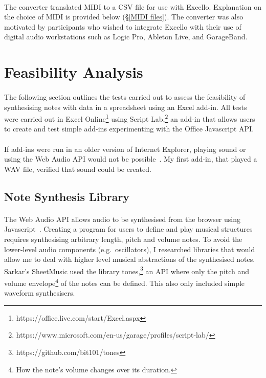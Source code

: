 \paragraph{} The converter translated MIDI to a CSV file for use with Excello. Explanation on the choice of MIDI is provided below (\S\ref{MIDI files}). The converter was also motivated by participants who wished to integrate Excello with their use of digital audio workstations such as Logic Pro, Ableton Live, and GarageBand.

\section{Feasibility Analysis}

\paragraph{} The following section outlines the tests carried out to assess the feasibility of synthesising notes with data in a spreadsheet using an Excel add-in. All tests were carried out in Excel Online\footnote{https://office.live.com/start/Excel.aspx} using Script Lab,\footnote{https://www.microsoft.com/en-us/garage/profiles/script-lab/} an add-in that allows users to create and test simple add-ins experimenting with the Office Javascript API.

\paragraph{} If add-ins were run in an older version of Internet Explorer, playing sound or using the Web Audio API would not be possible~\cite{mozilla:webaudioapi}. My first add-in, that played a WAV file, verified that sound could be created.

\subsection{Note Synthesis Library}

\paragraph{} The Web Audio API allows audio to be synthesised from the browser using Javascript~\cite{mozilla:webaudioapi}. Creating a program for users to define and play musical structures requires synthesising arbitrary length, pitch and volume notes. To avoid the lower-level audio components (e.g.~oscillators), I researched libraries that would allow me to deal with higher level musical abstractions of the synthesised notes. Sarkar's SheetMusic used the library tones,\footnote{https://github.com/bit101/tones} an API where only the pitch and volume envelope\footnote{How the note's volume changes over its duration.} of the notes can be defined. This also only included simple waveform synthesisers.

